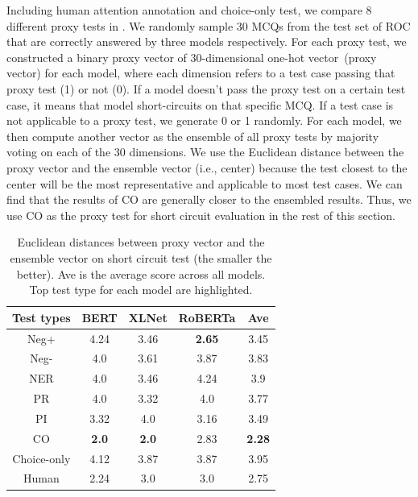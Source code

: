 Including human attention annotation and choice-only test, we compare 8 different 
proxy tests in . 
We randomly sample 30 MCQs from the test set of ROC that are correctly answered 
by three models respectively. 
For each proxy test, we constructed a binary proxy vector 
of 30-dimensional one-hot vector~(proxy vector) for each model, where each dimension refers to 
a test case passing that proxy test (1) or not (0). If a model doesn't pass the proxy test 
on a certain test case, it means that model short-circuits on that specific MCQ. 
If a test case is not applicable to a proxy test, we generate 0 or 1 randomly.
For each model, we then compute another vector as the ensemble of all proxy tests by 
majority voting on each of the 30 dimensions. We use the Euclidean distance between the 
proxy vector and the ensemble vector (i.e., center) because the test 
closest to the center will be the most 
representative and applicable to most test cases.  
We can find that the results of CO are generally closer to the ensembled results. 
Thus, we use CO as the proxy test for short circuit evaluation in the rest of
this section. 

\begin{table}[th]
	\scriptsize
	\centering
	\begin{tabular}{c|cccc}\hline
		\toprule  
		\textbf{Test types} &BERT  & XLNet & RoBERTa  &Ave\\ 
		\midrule
		{Neg+}      &  4.24   	&   3.46  &	\textbf{2.65}	&3.45\\
		\midrule
		{Neg-}&   4.0 	&       3.61  &	3.87	&3.83\\
		\midrule
		{NER}    &   4.0 	&  3.46      &	4.24	&3.9\\
		\midrule
		{PR}&    4.0 	&    3.32   &	4.0	&3.77\\
		\midrule
		{PI}&   3.32 	&    4.0    &	3.16	&3.49\\
		\midrule
		{CO}  &      \textbf{2.0}   	&  \textbf{ 2.0} &	2.83	&\textbf{2.28}\\
		\midrule
		{Choice-only}   &  4.12  	&3.87  &	3.87	&3.95\\
		\midrule
		{Human}   & 2.24	&   3.0&	3.0	&2.75\\
		\bottomrule
		\hline
	\end{tabular}
	\caption{\label{tab:agree} 
		Euclidean distances between proxy vector and 
		the ensemble vector on short circuit test (the smaller
		the better). 
		Ave is the average score across all models.
		Top test type for each model are highlighted.}
\end{table}


